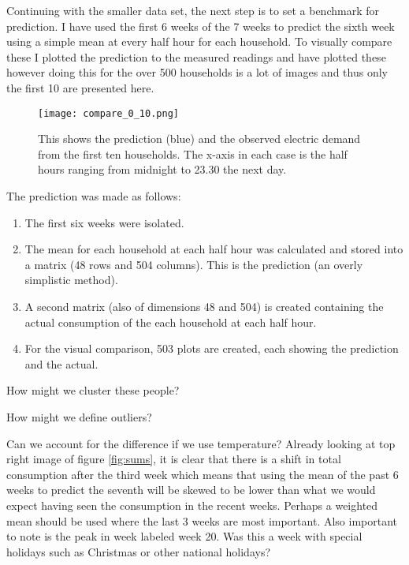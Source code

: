 \documentclass[a4paper]{article}
\begin{document}
Continuing with the smaller data set, the next step is to set a benchmark for prediction. I have used the first 6 weeks of the 7 weeks to predict the sixth week using a simple mean at every half hour for each household. To visually compare these I plotted the prediction to the measured readings and have plotted these however doing this for the over 500 households is a lot of images and thus only the first 10 are presented here.
\begin{figure}
\centering
\texttt{[image: compare\_0\_10.png]}
\caption{\label{fig:mean_pred} This shows the prediction (blue) and the observed electric demand from the first ten households. The x-axis in each case is the half hours ranging from midnight to 23.30 the next day.}
\end{figure}

The prediction was made as follows:
\begin{enumerate}
\item The first six weeks were isolated.
\item The mean for each household at each half hour was calculated and stored into a matrix (48 rows and 504 columns). This is the prediction (an overly simplistic method).
\item A second matrix (also of dimensions 48 and 504) is created containing the actual consumption of the each household at each half hour.
\item For the visual comparison, 503 plots are created, each showing the prediction and the actual.
\end{enumerate}

How might we cluster these people?

How might we define outliers?

Can we account for the difference if we use temperature?
Already looking at top right image of figure \ref{fig:sums}, it is clear that there is a shift in total consumption after the third week which means that using the mean of the past 6 weeks to predict the seventh will be skewed to be lower than what we would expect having seen the consumption in the recent weeks. Perhaps a weighted mean should be used where the last 3 weeks are most important. Also important to note is the peak in week labeled week 20. Was this a week with special holidays such as Christmas or other national holidays?
\end{document}
